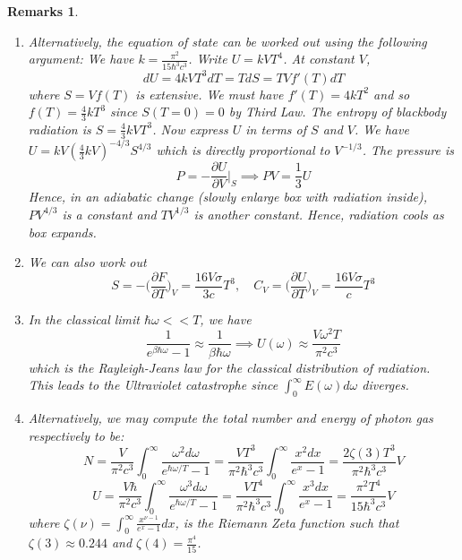 \documentclass[a4paper]{article}
\newtheorem{remarks}{Remarks}[section]
\theoremstyle{new}
\begin{document}
\begin{remarks}\leavevmode
\begin{enumerate}
\item Alternatively, the equation of state can be worked out using the following argument: We have $k=\frac{\pi^2}{15\hbar^3c^3}$. Write $U=kVT^4$. At constant $V$,
$$dU=4kVT^3dT=TdS=TVf'(T)dT$$
where $S=Vf(T)$ is extensive. We must have $f'(T)=4kT^2$ and so $f(T)=\frac{4}{3}kT^3$ since $S(T=0)=0$ by Third Law. The entropy of blackbody radiation is $S=\frac{4}{3}kVT^3$. Now express $U$ in terms of $S$ and $V$. We have $U=kV(\frac{4}{3}kV)^{-4/3}S^{4/3}$ which is directly proportional to $V^{-1/3}$. The pressure is 
$$P=-\frac{\partial U}{\partial V}\bigg|_S\implies PV=\frac{1}{3}U$$
Hence, in an adiabatic change (slowly enlarge box with radiation inside), $PV^{4/3}$ is a constant and $TV^{1/3}$ is another constant. Hence, radiation cools as box expands.
\item We can also work out
$$S=-\bigg(\frac{\partial F}{\partial T}\bigg)_V=\frac{16V\sigma}{3c}T^3,\quad C_V=\bigg(\frac{\partial U}{\partial T}\bigg)_V=\frac{16V\sigma}{c}T^3$$
\item In the classical limit $\hbar\omega<<T$, we have
$$\frac{1}{e^{\beta\hbar\omega}-1}\approx\frac{1}{\beta\hbar\omega}\implies U(\omega)\approx\frac{V\omega^2T}{\pi^2c^3}$$
which is the Rayleigh-Jeans law for the classical distribution of radiation. This leads to the Ultraviolet catastrophe since $\int_0^\infty E(\omega)d\omega$ diverges.
\item Alternatively, we may compute the total number and energy of photon gas respectively to be:
$$N=\frac{V}{\pi^2c^3}\int_0^\infty\frac{\omega^2d\omega}{e^{\hbar\omega/T}-1}=\frac{VT^3}{\pi^2\hbar^3c^3}\int_0^\infty\frac{x^2dx}{e^x-1}=\frac{2\zeta(3)T^3}{\pi^2\hbar^3c^3}V$$
$$U=\frac{V\hbar}{\pi^2c^3}\int_0^\infty\frac{\omega^3d\omega}{e^{\hbar\omega/T}-1}=\frac{VT^4}{\pi^2\hbar^3c^3}\int_0^\infty\frac{x^3dx}{e^x-1}=\frac{\pi^2T^4}{15\hbar^3c^3}V$$
where $\zeta(\nu)=\int_0^\infty\frac{x^{\nu-1}}{e^x-1}dx$, is the Riemann Zeta function such that $\zeta(3)\approx 0.244$ and $\zeta(4)=\frac{\pi^4}{15}$.
\end{enumerate}
\end{remarks}
\end{document}
